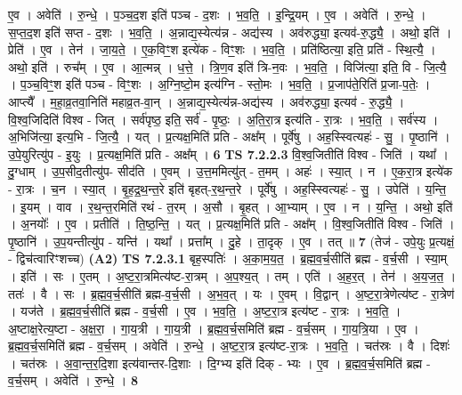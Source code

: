 \documentclass[17pt]{extarticle}
\begin{document}
                  ए॒व । अवेति॑ । रु॒न्धे॒ । प॒ञ्च॒द॒श इति॑ पञ्च - द॒शः । भ॒व॒ति॒ । इ॒न्द्रि॒यम् । ए॒व । अवेति॑ । रु॒न्धे॒ । स॒प्त॒द॒श इति॑ सप्त - द॒शः । भ॒व॒ति॒ । अ॒न्नाद्य॒स्येत्य॑न्न - अद्य॑स्य । अव॑रुद्ध्या॒ इत्यव॑-रु॒द्ध्यै॒ । अथो॒ इति॑ । प्रेति॑ । ए॒व । तेन॑ । जा॒य॒ते॒ । ए॒क॒विꣳ॒॒श इत्ये॑क - विꣳ॒॒शः । भ॒व॒ति॒ । प्रति॑ष्ठित्या॒ इति॒ प्रति॑ - स्थि॒त्यै॒ । अथो॒ इति॑ । रुच᳚म् । ए॒व । आ॒त्मन्न् । ध॒त्ते॒ । त्रि॒ण॒व इति॑ त्रि-न॒वः । भ॒व॒ति॒ । विजि॑त्या॒ इति॒ वि - जि॒त्यै॒ । प॒ञ्च॒विꣳ॒॒श इति॑ पञ्च - विꣳ॒॒शः । अ॒ग्नि॒ष्टो॒म इत्य॑ग्नि - स्तो॒मः । भ॒व॒ति॒ । प्र॒जाप॑ते॒रिति॑ प्र॒जा-प॒तेः॒ । आप्त्यै᳚ । म॒हा॒व्र॒तवा॒निति॑ महाव्र॒त-वा॒न् । अ॒न्नाद्य॒स्येत्य॑न्न-अद्य॑स्य । अव॑रुद्ध्या॒ इत्यव॑ - रु॒द्ध्यै॒ । वि॒श्व॒जिदिति॑ विश्व - जित् । सर्व॑पृष्ठ॒ इति॒ सर्व॑ - पृ॒ष्ठः॒ । अ॒ति॒रा॒त्र इत्य॑ति - रा॒त्रः । भ॒व॒ति॒ । सर्व॑स्य । अ॒भिजि॑त्या॒ इत्य॒भि - जि॒त्यै॒ । यत् । प्र॒त्यक्ष॒मिति॑ प्रति - अक्ष᳚म् । पूर्वे॑षु । अह॒स्स्वित्यहः॑ - सु॒ । पृ॒ष्ठानि॑ । उ॒पे॒युरित्यु॑प - इ॒युः । प्र॒त्यक्ष॒मिति॑ प्रति - अक्ष᳚म् । \textbf{  6} \newline
                  \newline
                                \textbf{ TS 7.2.2.3} \newline
                  वि॒श्व॒जितीति॑ विश्व - जिति॑ । यथा᳚ । दु॒ग्धाम् । उ॒प॒सीद॒तीत्यु॑प- सीद॑ति । ए॒वम् । उ॒त्त॒ममित्यु॑त् - त॒मम् । अहः॑ । स्या॒त् । न । ए॒क॒रा॒त्र इत्ये॑क - रा॒त्रः । च॒न । स्या॒त् । बृ॒ह॒द्र॒थ॒न्त॒रे इति॑ बृहत्-र॒थ॒न्त॒रे । पूर्वे॑षु । अह॒स्स्वित्यहः॑ - सु॒ । उपेति॑ । य॒न्ति॒ । इ॒यम् । वाव । र॒थ॒न्त॒रमिति॑ रथं - त॒रम् । अ॒सौ । बृ॒हत् । आ॒भ्याम् । ए॒व । न । य॒न्ति॒ । अथो॒ इति॑ । अ॒नयोः᳚ । ए॒व । प्रतीति॑ । ति॒ष्ठ॒न्ति॒ । यत् । प्र॒त्यक्ष॒मिति॑ प्रति - अक्ष᳚म् । वि॒श्व॒जितीति॑ विश्व - जिति॑ । पृ॒ष्ठानि॑ । उ॒प॒यन्तीत्यु॑प - यन्ति॑ । यथा᳚ । प्रत्ता᳚म् । दु॒हे । ता॒दृक् । ए॒व । तत् ॥ \textbf{  7} \newline
                  \newline
                      (तेज॑ - उपे॒युः प्र॒त्यक्षं॒ - द्विच॑त्वारिꣳशच्च)  \textbf{(A2)} \newline \newline
                                \textbf{ TS 7.2.3.1} \newline
                  बृह॒स्पतिः॑ । अ॒का॒म॒य॒त॒ । ब्र॒ह्म॒व॒र्च॒सीति॑ ब्रह्म - व॒र्च॒सी । स्या॒म् । इति॑ । सः । ए॒तम् । अ॒ष्ट॒रा॒त्रमित्य॑ष्ट-रा॒त्रम् । अ॒प॒श्य॒त् । तम् । एति॑ । अ॒ह॒र॒त् । तेन॑ । अ॒य॒ज॒त॒ । ततः॑ । वै । सः । ब्र॒ह्म॒व॒र्च॒सीति॑ ब्रह्म-व॒र्च॒सी । अ॒भ॒व॒त् । यः । ए॒वम् । वि॒द्वान् । अ॒ष्ट॒रा॒त्रेणेत्य॑ष्ट - रा॒त्रेण॑ । यज॑ते । ब्र॒ह्म॒व॒र्च॒सीति॑ ब्रह्म - व॒र्च॒सी । ए॒व । भ॒व॒ति॒ । अ॒ष्ट॒रा॒त्र इत्य॑ष्ट - रा॒त्रः । भ॒व॒ति॒ । अ॒ष्टाक्ष॒रेत्य॒ष्टा - अ॒क्ष॒रा॒ । गा॒य॒त्री । गा॒य॒त्री । ब्र॒ह्म॒व॒र्च॒समिति॑ ब्रह्म - व॒र्च॒सम् । गा॒य॒त्रि॒या । ए॒व । ब्र॒ह्म॒व॒र्च॒समिति॑ ब्रह्म - व॒र्च॒सम् । अवेति॑ । रु॒न्धे॒ । अ॒ष्ट॒रा॒त्र इत्य॑ष्ट-रा॒त्रः । भ॒व॒ति॒ । चत॑स्रः । वै । दिशः॑ । चत॑स्रः । अ॒वा॒न्त॒र॒दि॒शा इत्य॑वान्तर-दि॒शाः । दि॒ग्भ्य इति॑ दिक् - भ्यः । ए॒व । ब्र॒ह्म॒व॒र्च॒समिति॑ ब्रह्म - व॒र्च॒सम् । अवेति॑ । रु॒न्धे॒ । \textbf{  8} \newline
\end{document}
